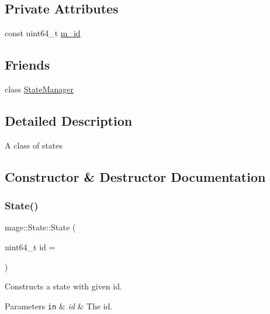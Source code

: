 \subsection*{Private Attributes}
\begin{DoxyCompactItemize}
\item 
const uint64\+\_\+t \hyperlink{classmage_1_1_state_ab135514ec2250e9680b35cfab4e91cab}{m\+\_\+id}
\end{DoxyCompactItemize}
\subsection*{Friends}
\begin{DoxyCompactItemize}
\item 
class \hyperlink{classmage_1_1_state_a8055e77bf0267832ef337718a11fec0d}{State\+Manager}
\end{DoxyCompactItemize}


\subsection{Detailed Description}
A class of states 

\subsection{Constructor \& Destructor Documentation}
\hypertarget{classmage_1_1_state_ac21bb6de22bb3b9c1b18d98b53e92100}{}\label{classmage_1_1_state_ac21bb6de22bb3b9c1b18d98b53e92100} 
\subsubsection{\texorpdfstring{State()}{State()}\hspace{0.1cm}{\footnotesize\ttfamily [1/2]}}
{\footnotesize\ttfamily mage\+::\+State\+::\+State (\begin{DoxyParamCaption}\item[{uint64\+\_\+t}]{id = {} }\end{DoxyParamCaption})}

Constructs a state with given id.


\begin{DoxyParams}[1]{Parameters}
\mbox{\tt in}  & {\em id} & The id. \\
\hline
\end{DoxyParams}
\hypertarget{classmage_1_1_state_a84d2fed20df97a3718ab4a554b677e52}{}\label{classmage_1_1_state_a84d2fed20df97a3718ab4a554b677e52} 
